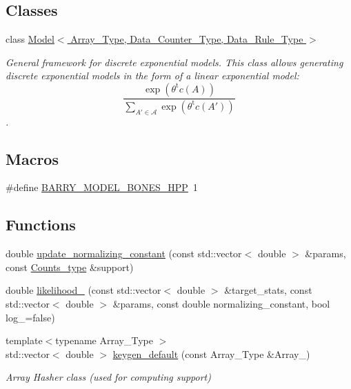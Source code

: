 \subsection*{Classes}
\begin{DoxyCompactItemize}
\item 
class \hyperlink{class_model}{Model$<$ Array\+\_\+\+Type, Data\+\_\+\+Counter\+\_\+\+Type, Data\+\_\+\+Rule\+\_\+\+Type $>$}
\begin{DoxyCompactList}\small\item\em General framework for discrete exponential models. This class allows generating discrete exponential models in the form of a linear exponential model\+: \[ \frac{ \exp{\left(\theta^{\mbox{t}}c(A)\right)} }{ \sum_{A'\in \mathcal{A}}\exp{\left(\theta^{\mbox{t}}c(A')\right)} } \]. \end{DoxyCompactList}\end{DoxyCompactItemize}
\subsection*{Macros}
\begin{DoxyCompactItemize}
\item 
\#define \hyperlink{barry_8hpp_a503559d5681e7b0152cc9c9c57bb4d2a}{B\+A\+R\+R\+Y\+\_\+\+M\+O\+D\+E\+L\+\_\+\+B\+O\+N\+E\+S\+\_\+\+H\+PP}~1
\end{DoxyCompactItemize}
\subsection*{Functions}
\begin{DoxyCompactItemize}
\item 
double \hyperlink{model-bones_8hpp_a557368a4713ccf9ee1867c1bd17d58ba}{update\+\_\+normalizing\+\_\+constant} (const std\+::vector$<$ double $>$ \&params, const \hyperlink{typedefs_8hpp_aee40fa17c1fddb63dd1f2b1470ade95b}{Counts\+\_\+type} \&support)
\item 
double \hyperlink{model-bones_8hpp_a30867af87b732210c25b5148a8909454}{likelihood\+\_\+} (const std\+::vector$<$ double $>$ \&target\+\_\+stats, const std\+::vector$<$ double $>$ \&params, const double normalizing\+\_\+constant, bool log\+\_\+=false)
\item 
{\footnotesize template$<$typename Array\+\_\+\+Type $>$ }\\std\+::vector$<$ double $>$ \hyperlink{model-bones_8hpp_ac8a92bc92bfb721602c0470f3efa4f84}{keygen\+\_\+default} (const Array\+\_\+\+Type \&Array\+\_\+)
\begin{DoxyCompactList}\small\item\em Array Hasher class (used for computing support) \end{DoxyCompactList}\end{DoxyCompactItemize}


